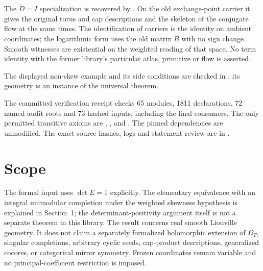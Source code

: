 The $\widetilde D=I$ specialization is recovered by
. On the old exchange-point carrier it
gives the original torus and cap descriptions and the skeleton of the
conjugate flow at the same times. The identification of carriers is the
identity on ambient coordinates; the logarithmic form uses the old
matrix $B$ with no sign change. Smooth witnesses are existential on the
weighted reading of that space. No term identity with the former
library's particular atlas, primitive or flow is asserted.

The displayed non-skew example and its side conditions are checked in
; its geometry is an instance of the universal theorem.

The committed verification receipt checks 65 modules, 1811 declarations,
72 named audit roots and 73 hashed inputs, including the final
consumers. The only permitted transitive axioms are
, , and .
The pinned dependencies are unmodified. The exact source hashes, logs and
statement review are in .

\section{Scope}
The formal input uses $\det E=1$ explicitly. The elementary equivalence
with an integral unimodular completion under the weighted skewness
hypothesis is explained in Section~1; the determinant-positivity argument
itself is not a separate theorem in this library.
The result concerns real smooth Liouville geometry. It does not claim a
separately formalized holomorphic extension of $\Omega_T$, singular
completions, arbitrary cyclic seeds, cap-product descriptions, generalized
cocores, or categorical mirror symmetry. Frozen coordinates remain
variable and no principal-coefficient restriction is imposed.

